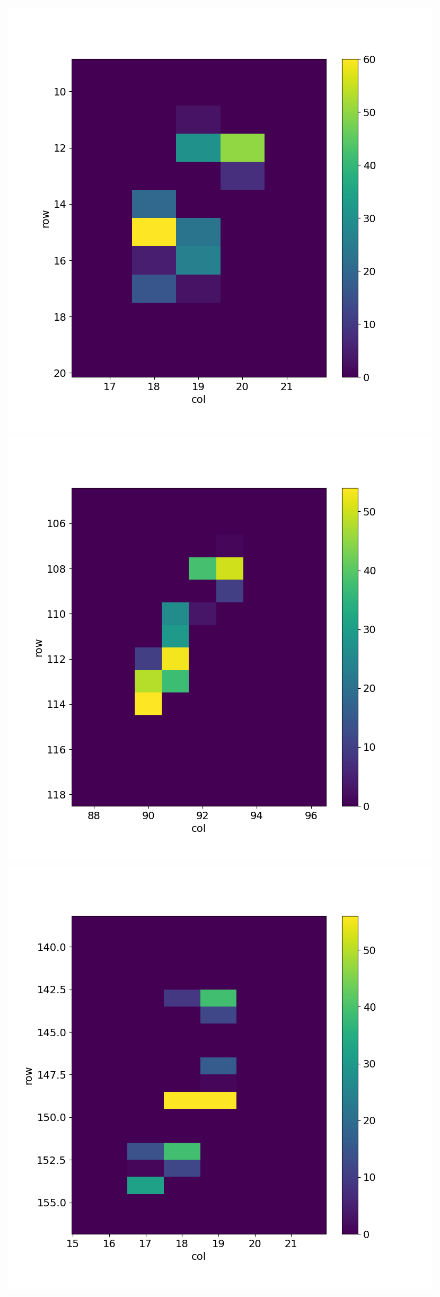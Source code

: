 \begin{figure}[h!]
            \includegraphics[width=.24\linewidth]{figures/charaterization/evts/cosmic_rays/11a.png}
            \includegraphics[width=.24\linewidth]{figures/charaterization/evts/cosmic_rays/12.png}
            \includegraphics[width=.24\linewidth]{figures/charaterization/evts/cosmic_rays/12b.png}               
            \caption{ }
            \label{fig:hit_map_cosmic_rays}
        \end{figure} 


